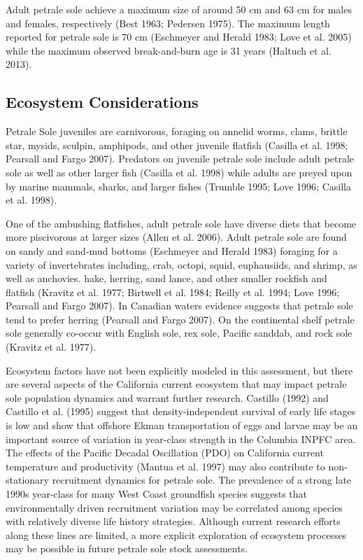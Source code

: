 \documentclass[11pt,
  english,
  letterpaper,
]{article}
\begin{document}
Adult petrale sole achieve a maximum size of around 50 cm and 63 cm for males and females, respectively (Best 1963; Pedersen 1975). The maximum length reported for petrale sole is 70 cm (Eschmeyer and Herald 1983; Love et al. 2005) while the maximum observed break-and-burn age is 31 years (Haltuch et al. 2013).

\hypertarget{ecosystem-considerations-1}{%
\subsection{Ecosystem Considerations}\label{ecosystem-considerations-1}}

Petrale Sole juveniles are carnivorous, foraging on annelid worms, clams, brittle star, mysids, sculpin, amphipods, and other juvenile flatfish (Casilla et al. 1998; Pearsall and Fargo 2007). Predators on juvenile petrale sole include adult petrale sole as well as other larger fish (Casilla et al. 1998) while adults are preyed upon by marine mammals, sharks, and larger fishes (Trumble 1995; Love 1996; Casilla et al. 1998).

One of the ambushing flatfishes, adult petrale sole have diverse diets that become more piscivorous at larger sizes (Allen et al. 2006). Adult petrale sole are found on sandy and sand-mud bottoms (Eschmeyer and Herald 1983) foraging for a variety of invertebrates including, crab, octopi, squid, euphausiids, and shrimp, as well as anchovies. hake, herring, sand lance, and other smaller rockfish and flatfish (Kravitz et al. 1977; Birtwell et al. 1984; Reilly et al. 1994; Love 1996; Pearsall and Fargo 2007). In Canadian waters evidence suggests that petrale sole tend to prefer herring (Pearsall and Fargo 2007). On the continental shelf petrale sole generally co-occur with English sole, rex sole, Pacific sanddab, and rock sole (Kravitz et al. 1977).

Ecosystem factors have not been explicitly modeled in this assessment, but there are several aspects of the California current ecosystem that may impact petrale sole population dynamics and warrant further research. Castillo (1992) and Castillo et al. (1995) suggest that density-independent survival of early life stages is low and show that offshore Ekman transportation of eggs and larvae may be an important source of variation in year-class strength in the Columbia INPFC area. The effects of the Pacific Decadal Oscillation (PDO) on California current temperature and productivity (Mantua et al. 1997) may also contribute to non-stationary recruitment dynamics for petrale sole. The prevalence of a strong late 1990s year-class for many West Coast groundfish species suggests that environmentally driven recruitment variation may be correlated among species with relatively diverse life history strategies. Although current research efforts along these lines are limited, a more explicit exploration of ecosystem processes may be possible in future petrale sole stock assessments.
\end{document}
